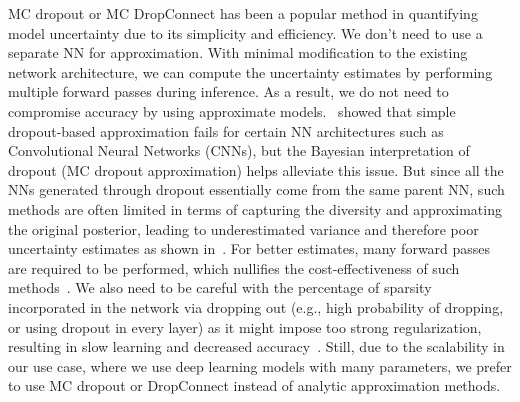     MC dropout or MC DropConnect has been a popular method in quantifying model uncertainty due to its simplicity and efficiency. We don't need to use a separate NN for approximation. With minimal modification to the existing network architecture, we can compute the uncertainty estimates by performing multiple forward passes during inference. As a result, we do not need to compromise accuracy by using approximate models.~\cite{BayesCNN} showed that simple dropout-based approximation fails for certain NN architectures such as Convolutional Neural Networks (CNNs), but the Bayesian interpretation of dropout (MC dropout approximation) helps alleviate this issue. But since all the NNs generated through dropout essentially come from the same parent NN, such methods are often limited in terms of capturing the diversity and approximating the original posterior, leading to underestimated variance and therefore poor uncertainty estimates as shown in~\cite{DropoutIssues1, DropoutIssues2}. For better estimates, many forward passes are required to be performed, which nullifies the cost-effectiveness of such methods~\cite{BayesCNN}. We also need to be careful with the percentage of sparsity incorporated in the network via dropping out (e.g., high probability of dropping, or using dropout in every layer) as it might impose too strong regularization, resulting in slow learning and decreased accuracy~\cite{BayesSegNetUnc}. Still, due to the scalability in our use case, where we use deep learning models with many parameters, we prefer to use MC dropout or DropConnect instead of analytic approximation methods.
    


